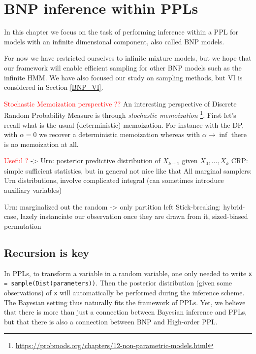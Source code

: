 
\chapter{\gls{BNP} inference within \glspl{PPL}} \label{BNP_PPL}
In this chapter we focus on the task of performing inference within a \gls{PPL} for models with an infinite dimensional component, also called \gls{BNP} models.

For now we have restricted ourselves to infinite mixture models, but we hope that our framework will enable efficient sampling for other \gls{BNP} models such as the infinite \acrlong{HMM}. We have also focused our study on sampling methods, but \acrlong{VI} is considered in Section \ref{BNP_VI}.

\textcolor{red}{Stochastic Memoization perspective ??}
An interesting perspective of Discrete Random Probability Measure is through \textit{stochastic memoization} \footnote{\url{https://probmods.org/chapters/12-non-parametric-models.html}}.
First let's recall what is the usual (deterministic) memoization.
For instance with the \gls{DP}, with $\alpha = 0$ we recover a deterministic memoization whereas with $\alpha \rightarrow \inf$ there is no memoization at all.

\textcolor{red}{Useful ?}
-> Urn: posterior predictive distribution of $X_{k+1}$ given $X_0, \dots, X_{k}$
CRP: simple sufficient statistics, but in general not nice like that
All marginal samplers: Urn distributions, involve complicated integral (can sometimes introduce auxiliary variables)

Urn: marginalized out the random -> only partition left
Stick-breaking: hybrid-case, lazely instanciate our observation once they are drawn from it, sized-biased permutation

\section{Recursion is key}

In \glspl{PPL}, to transform a variable in a random variable, one only needed to write \texttt{x = sample(Dist(parameters))}. Then the posterior distribution (given some observations) of \texttt{x} will automatically be performed during the inference scheme.
The Bayesian setting thus naturally fits the framework of \glspl{PPL}.
Yet, we believe that there is more  than just a connection between Bayesian inference and \glspl{PPL}, but that there is also a connection between \acrlong{BNP} and High-order \gls{PPL}.

